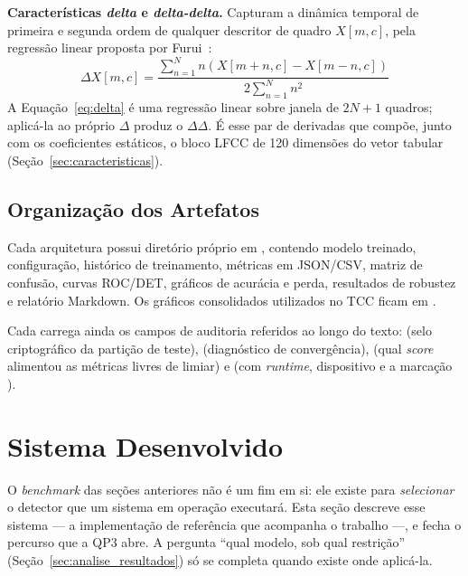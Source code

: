 \documentclass[12pt,a4paper]{article}
\begin{document}
\textbf{Características \textit{delta} e \textit{delta-delta}.} Capturam a
dinâmica temporal de primeira e segunda ordem de qualquer descritor de
quadro $X[m,c]$, pela regressão linear proposta por
Furui~\cite{furui1986speaker}:
\begin{equation}
	\label{eq:delta}
	\Delta X[m,c] = \frac{\displaystyle\sum_{n=1}^{N}n(X[m+n,c]-X[m-n,c])}
	{2\displaystyle\sum_{n=1}^{N}n^2}
\end{equation}
\noindent
A Equação~\ref{eq:delta} é uma regressão linear sobre janela de $2N+1$ quadros;
aplicá-la ao próprio $\Delta$ produz o $\Delta\Delta$. É esse par de derivadas
que compõe, junto com os coeficientes estáticos, o bloco LFCC de \num{120}
dimensões do vetor tabular (Seção~\ref{sec:caracteristicas}).




\subsection{Organização dos Artefatos}

Cada arquitetura possui diretório próprio em , contendo
modelo treinado, configuração, histórico de treinamento, métricas em JSON/CSV,
matriz de confusão, curvas ROC/DET, gráficos de acurácia e perda, resultados de
robustez e relatório Markdown. Os gráficos consolidados utilizados no TCC
ficam em .

Cada  carrega ainda os campos de auditoria referidos ao
longo do texto:  (selo criptográfico da
partição de teste),  (diagnóstico de convergência),
 (qual \textit{score} alimentou as métricas livres de
limiar) e  (com \textit{runtime}, dispositivo e a
marcação ).

\section{Sistema Desenvolvido}
\label{sec:sistema}

O \textit{benchmark} das seções anteriores não é um fim em si: ele existe para
\emph{selecionar} o detector que um sistema em operação executará. Esta
seção descreve esse sistema --- a implementação de referência que acompanha o
trabalho ---, e fecha o percurso que a QP3 abre. A pergunta ``qual modelo, sob
qual restrição'' (Seção~\ref{sec:analise_resultados}) só se completa quando
existe onde aplicá-la.
\end{document}
